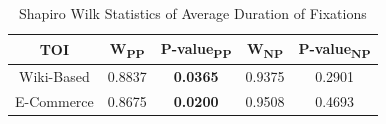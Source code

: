 \begin{table} [H]
    \centering
    \small
    \caption{Shapiro Wilk Statistics of Average Duration of Fixations}
    \label{tab:adf_W_stats}
    \begin{tabular}{|c|c|c|c|c|}
        \hline
        \textbf{TOI} & \textbf{W\textsubscript{PP}} & \textbf{P-value\textsubscript{PP}} & \textbf{W\textsubscript{NP}} & \textbf{P-value\textsubscript{NP}} \\ \hline
        Wiki-Based & 0.8837 & \textbf{\color{red}0.0365} & 0.9375 & 0.2901 \\ \hline
        E-Commerce & 0.8675 & \textbf{\color{red}0.0200} & 0.9508 & 0.4693 \\ \hline
    \end{tabular}
\end{table}

\begin{table}[H]
    \centering
    \small
    \setlength{\tabcolsep}{4pt}
    \caption{Statistics of Average Duration of Fixations}
    \label{tab:adf_stats}
\end{table}

